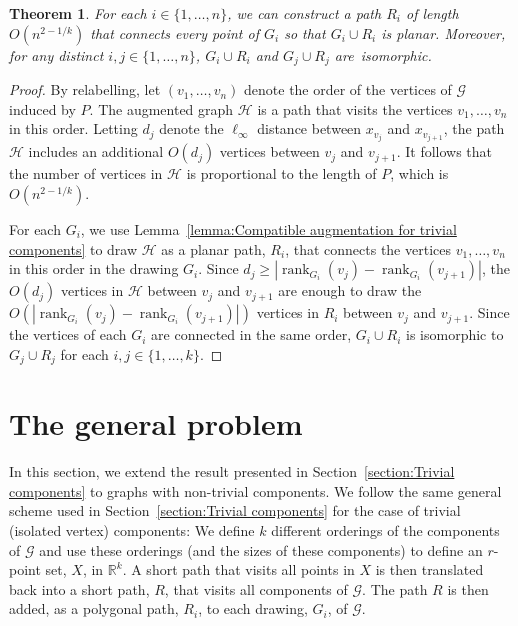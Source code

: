 \documentclass{patmorin}
\newtheorem{theorem}{Theorem}[section]
\DeclareMathOperator{\rank}{rank}
\newcommand{\R}{\mathbb{R}}
\begin{document}
\begin{theorem}\label{theorem:points}
For each $i\in \{1,\dots,n\}$, we can construct a path $R_i$ of length $O(n^{2-1/k})$ that connects every point of $G_i$ so that $G_i\cup R_i$ is planar. Moreover, for any distinct $i,j\in \{1,\dots,n\}$, $G_i\cup R_i$ and $G_j\cup R_j$ are~isomorphic.
\end{theorem}
\begin{proof}
By relabelling, let $(v_1, \ldots, v_n)$ denote the order of the vertices of $\mathcal{G}$ induced by $P$.  The augmented graph $\mathcal{H}$ is a path that visits the vertices $v_1,\ldots,v_n$ in this order. Letting $d_j$ denote the $\ell_\infty$ distance between $x_{v_j}$ and $x_{v_{j+1}}$, the path $\mathcal{H}$ includes an additional $O(d_j)$ vertices between $v_{j}$ and $v_{j+1}$.  It follows that the number of vertices
in $\mathcal{H}$ is proportional to the length of $P$, which is $O(n^{2-1/k})$.

For each $G_i$, we use Lemma~\ref{lemma:Compatible augmentation for trivial components} to draw $\mathcal{H}$ as a planar path, $R_i$,
that connects the vertices $v_1,\ldots,v_n$ in this order in the drawing $G_i$.
Since $d_j\ge |\rank_{G_i}(v_j) - \rank_{G_i}(v_{j+1})|$, the $O(d_j)$
vertices in $\mathcal{H}$ between $v_j$ and $v_{j+1}$ are enough to
draw the $O(|\rank_{G_i}(v_j) - \rank_{G_i}(v_{j+1})|)$ vertices in $R_i$
between $v_j$ and $v_{j+1}$.
Since the vertices of each $G_i$ are connected in the same order,
$G_i\cup R_i$ is isomorphic to $G_j\cup R_j$ for each $i,j\in\{1,\ldots,k\}$.
\end{proof}


\section{The general problem}\label{section:General}
In this section, we extend the result presented in
Section~\ref{section:Trivial components} to graphs with
non-trivial components.  We follow the same general scheme used in
Section~\ref{section:Trivial components} for the case of trivial
(isolated vertex) components:  We define $k$ different
orderings of the components of $\mathcal G$ and use these orderings (and
the sizes of these components) to define an $r$-point set, $X$, in $\R^k$. A
short path that visits all points in $X$ is then translated back into
a short path, $R$, that visits all components of $\mathcal G$. The path
$R$ is then
added, as a polygonal path, $R_i$, to each drawing, $G_i$, of $\mathcal G$.
\end{document}
